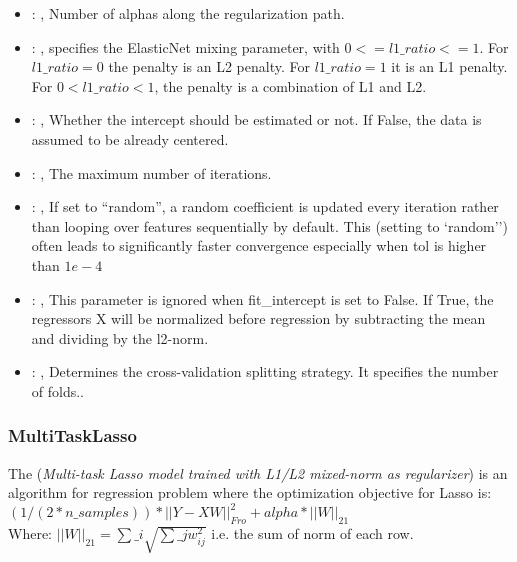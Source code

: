 \begin{itemize}
    \item {}: , 
      Number of alphas along the regularization path.

    \item {}: , 
      specifies the                                                  ElasticNet mixing parameter,
      with $0 <= l1\_ratio <= 1$.                                                  For $l1\_ratio =
      0$ the penalty is an L2 penalty.                                                  For
      $l1\_ratio = 1$ it is an L1 penalty.                                                  For $0 <
      l1\_ratio < 1$, the penalty is a combination of L1 and L2.

    \item {}: , 
      Whether the intercept should be estimated or not. If False,
      the data is assumed to be already centered.

    \item {}: , 
      The maximum number of iterations.

    \item {}: , 
      If set to ``random'', a random coefficient is updated every iteration
      rather than looping over features sequentially by default. This (setting to `random'')
      often leads to significantly faster convergence especially when tol is higher than $1e-4$

    \item {}: , 
      This parameter is ignored when fit\_intercept is set to False. If True,
      the regressors X will be normalized before regression by subtracting the mean and
      dividing by the l2-norm.

    \item {}: , 
      Determines the cross-validation splitting strategy.
      It specifies the number of folds..
  \end{itemize}


\subsubsection{MultiTaskLasso}
  The  (\textit{Multi-task Lasso model trained                         with
  L1/L2 mixed-norm as regularizer}) is an algorithm for regression problem
  where the optimization objective for Lasso is:                         $(1 / (2 * n\_samples)) *
  ||Y - XW||^2_{Fro} + alpha * ||W||_{21}$                         \\Where:
  $||W||_{21} = \sum\_i \sqrt{\sum\_j w_{ij}^2}$                         i.e. the sum of norm of each
  row.                         

